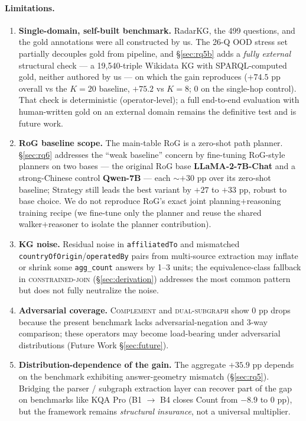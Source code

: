 \documentclass[11pt,a4paper]{article}
\newcommand{\qtype}[1]{\texttt{\small #1}}
\newcommand{\op}[1]{\textsc{\small #1}}
\begin{document}
\paragraph{Limitations.}
\begin{enumerate}[topsep=0pt,itemsep=2pt,leftmargin=*]
  \item \textbf{Single-domain, self-built benchmark.} RadarKG, the 499 questions, and the gold annotations were all constructed by us. The 26-Q OOD stress set partially decouples gold from pipeline, and §\ref{sec:rq5b} adds a \emph{fully external} structural check --- a 19{,}540-triple Wikidata KG with SPARQL-computed gold, neither authored by us --- on which the gain reproduces ($+74.5$ pp overall vs the $K{=}20$ baseline, $+75.2$ vs $K{=}8$; $0$ on the single-hop control). That check is deterministic (operator-level); a full end-to-end evaluation with human-written gold on an external domain remains the definitive test and is future work.
  \item \textbf{RoG baseline scope.} The main-table RoG is a zero-shot path planner. §\ref{sec:rq6} addresses the ``weak baseline'' concern by fine-tuning RoG-style planners on two bases --- the original RoG base \textbf{LLaMA-2-7B-Chat} \citep{luo2024rog} and a strong-Chinese control \textbf{Qwen-7B} --- each ${\sim}{+}30$ pp over its zero-shot baseline; Strategy still leads the best variant by $+27$ to $+33$ pp, robust to base choice. We do not reproduce RoG's exact joint planning+reasoning training recipe (we fine-tune only the planner and reuse the shared walker+reasoner to isolate the planner contribution).
  \item \textbf{KG noise.} Residual noise in \texttt{affiliatedTo} and mismatched \texttt{countryOfOrigin}/\texttt{operatedBy} pairs from multi-source extraction may inflate or shrink some \qtype{agg\_count} answers by 1--3 units; the equivalence-class fallback in \op{constrained-join} (§\ref{sec:derivation}) addresses the most common pattern but does not fully neutralize the noise.
  \item \textbf{Adversarial coverage.} \op{Complement} and \op{dual-subgraph} show 0 pp drops because the present benchmark lacks adversarial-negation and 3-way comparison; these operators may become load-bearing under adversarial distributions (Future Work §\ref{sec:future}).
  \item \textbf{Distribution-dependence of the gain.} The aggregate $+35.9$ pp depends on the benchmark exhibiting answer-geometry mismatch (§\ref{sec:rq5}). Bridging the parser / subgraph extraction layer can recover part of the gap on benchmarks like KQA Pro (B1 $\to$ B4 closes Count from $-8.9$ to 0 pp), but the framework remains \emph{structural insurance}, not a universal multiplier.

\end{enumerate}
\end{document}
